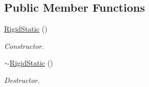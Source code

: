 \subsection*{Public Member Functions}
\begin{DoxyCompactItemize}
\item 
\hypertarget{classContent_1_1Actor_1_1Physics_1_1PhysX_1_1RigidStatic_ae08612cb4bbcd5c7aa29650183597128}{
\hyperlink{classContent_1_1Actor_1_1Physics_1_1PhysX_1_1RigidStatic_ae08612cb4bbcd5c7aa29650183597128}{RigidStatic} ()}
\label{classContent_1_1Actor_1_1Physics_1_1PhysX_1_1RigidStatic_ae08612cb4bbcd5c7aa29650183597128}

\begin{DoxyCompactList}\small\item\em Constructor. \item\end{DoxyCompactList}\item 
\hypertarget{classContent_1_1Actor_1_1Physics_1_1PhysX_1_1RigidStatic_aa7702b097a0ed9781cdbe9960ef06d03}{
\hyperlink{classContent_1_1Actor_1_1Physics_1_1PhysX_1_1RigidStatic_aa7702b097a0ed9781cdbe9960ef06d03}{$\sim$RigidStatic} ()}
\label{classContent_1_1Actor_1_1Physics_1_1PhysX_1_1RigidStatic_aa7702b097a0ed9781cdbe9960ef06d03}

\begin{DoxyCompactList}\small\item\em Destructor. \item\end{DoxyCompactList}\end{DoxyCompactItemize}
